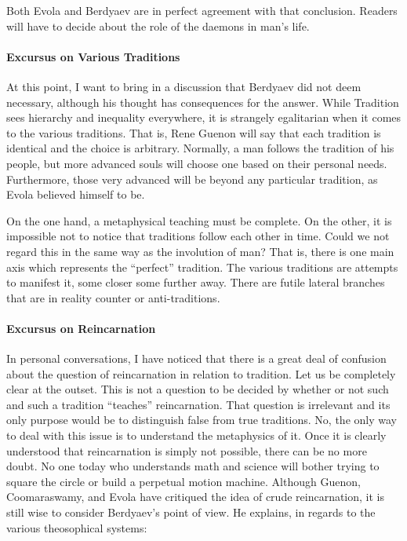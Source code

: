 Both Evola and Berdyaev are in perfect agreement with that conclusion. Readers will have to decide about the role of the daemons in man's life.

\paragraph{Excursus on Various Traditions}


At this point, I want to bring in a discussion that Berdyaev did not deem necessary, although his thought has consequences for the answer. While Tradition sees hierarchy and inequality everywhere, it is strangely egalitarian when it comes to the various traditions. That is, Rene Guenon will say that each tradition is identical and the choice is arbitrary. Normally, a man follows the tradition of his people, but more advanced souls will choose one based on their personal needs. Furthermore, those very advanced will be beyond any particular tradition, as Evola believed himself to be.

On the one hand, a metaphysical teaching must be complete. On the other, it is impossible not to notice that traditions follow each other in time. Could we not regard this in the same way as the involution of man? That is, there is one main axis which represents the ``perfect'' tradition. The various traditions are attempts to manifest it, some closer some further away. There are futile lateral branches that are in reality counter or anti-traditions.

\paragraph{Excursus on Reincarnation}

In personal conversations, I have noticed that there is a great deal of confusion about the question of reincarnation in relation to tradition. Let us be completely clear at the outset. This is not a question to be decided by whether or not such and such a tradition ``teaches'' reincarnation. That question is irrelevant and its only purpose would be to distinguish false from true traditions. No, the only way to deal with this issue is to understand the metaphysics of it. Once it is clearly understood that reincarnation is simply not possible, there can be no more doubt. No one today who understands math and science will bother trying to square the circle or build a perpetual motion machine. Although Guenon, Coomaraswamy, and Evola have critiqued the idea of crude reincarnation, it is still wise to consider Berdyaev's point of view. He explains, in regards to the various theosophical systems:

